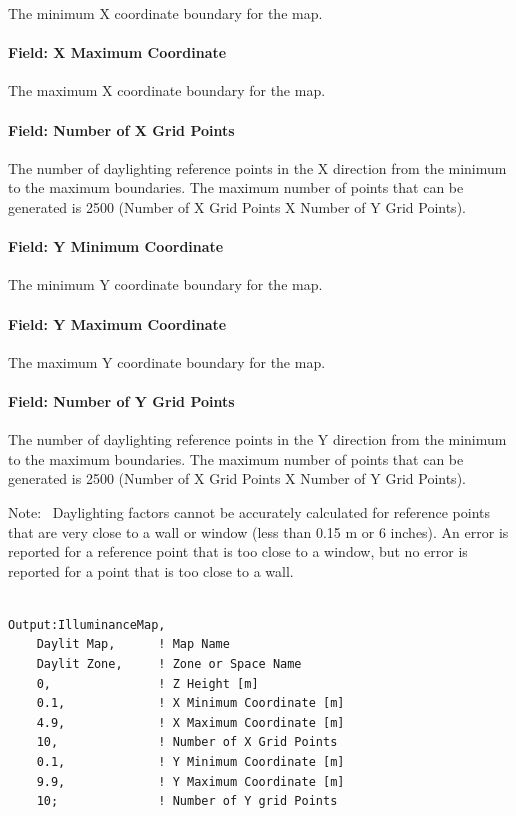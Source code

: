 The minimum X coordinate boundary for the map.

\paragraph{Field: X Maximum Coordinate}\label{field-x-maximum-coordinate}

The maximum X coordinate boundary for the map.

\paragraph{Field: Number of X Grid Points}\label{field-number-of-x-grid-points}

The number of daylighting reference points in the X direction from the minimum to the maximum boundaries. The maximum number of points that can be generated is 2500 (Number of X Grid Points X Number of Y Grid Points).

\paragraph{Field: Y Minimum Coordinate}\label{field-y-minimum-coordinate}

The minimum Y coordinate boundary for the map.

\paragraph{Field: Y Maximum Coordinate}\label{field-y-maximum-coordinate}

The maximum Y coordinate boundary for the map.

\paragraph{Field: Number of Y Grid Points}\label{field-number-of-y-grid-points}

The number of daylighting reference points in the Y direction from the minimum to the maximum boundaries. The maximum number of points that can be generated is 2500 (Number of X Grid Points X Number of Y Grid Points).

Note:~ Daylighting factors cannot be accurately calculated for reference points that are very close to a wall or window (less than 0.15 m or 6 inches). An error is reported for a reference point that is too close to a window, but no error is reported for a point that is too close to a wall.

\begin{lstlisting}

Output:IlluminanceMap,
    Daylit Map,      ! Map Name
    Daylit Zone,     ! Zone or Space Name
    0,               ! Z Height [m]
    0.1,             ! X Minimum Coordinate [m]
    4.9,             ! X Maximum Coordinate [m]
    10,              ! Number of X Grid Points
    0.1,             ! Y Minimum Coordinate [m]
    9.9,             ! Y Maximum Coordinate [m]
    10;              ! Number of Y grid Points
\end{lstlisting}

